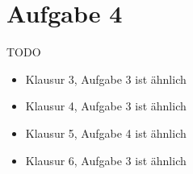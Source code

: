 \section*{Aufgabe 4}
TODO

\begin{itemize}
    \item Klausur 3, Aufgabe 3 ist ähnlich
    \item Klausur 4, Aufgabe 3 ist ähnlich
    \item Klausur 5, Aufgabe 4 ist ähnlich
    \item Klausur 6, Aufgabe 3 ist ähnlich
\end{itemize}
